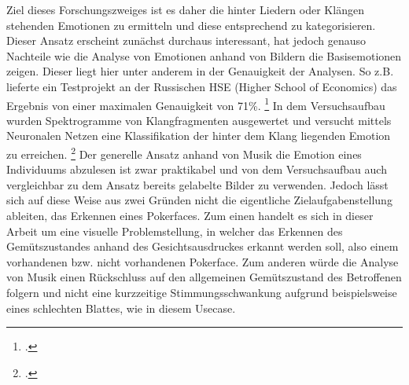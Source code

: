\documentclass[12pt, a4paper]{scrbook}
\begin{document}
Ziel dieses Forschungszweiges ist es daher die hinter Liedern oder Klängen stehenden Emotionen zu ermitteln und diese entsprechend zu kategorisieren.
Dieser Ansatz erscheint zunächst durchaus interessant, hat jedoch genauso Nachteile wie die Analyse von Emotionen anhand von Bildern die Basisemotionen zeigen. %
Dieser liegt hier unter anderem in der Genauigkeit der Analysen. So z.B. lieferte ein Testprojekt an der Russischen HSE (Higher School of Economics) das Ergebnis von einer maximalen Genauigkeit von 71\%.
\footcite[Vgl. ][Abstract]{EmotionInSound}
In dem Versuchsaufbau wurden Spektrogramme von Klangfragmenten ausgewertet und versucht mittels Neuronalen Netzen eine Klassifikation der hinter dem Klang liegenden Emotion zu erreichen.
\footcite[Vgl. ][Abstract]{EmotionInSound}
Der generelle Ansatz anhand von Musik die Emotion eines Individuums abzulesen ist zwar praktikabel und von dem Versuchsaufbau auch vergleichbar zu dem Ansatz bereits gelabelte Bilder zu verwenden. Jedoch lässt sich auf diese Weise aus zwei Gründen nicht die eigentliche Zielaufgabenstellung ableiten, das Erkennen eines Pokerfaces. Zum einen handelt es sich in dieser Arbeit um eine visuelle Problemstellung, in welcher das Erkennen des Gemütszustandes anhand des Gesichtsausdruckes erkannt werden soll, also einem vorhandenen bzw. nicht vorhandenen Pokerface. Zum anderen würde die Analyse von Musik einen Rückschluss auf den allgemeinen Gemütszustand des Betroffenen folgern und nicht eine kurzzeitige Stimmungsschwankung aufgrund beispielsweise eines schlechten Blattes, wie in diesem Usecase.


\let\cleardoublepage\relax
\newpage

\printbibheading
\printbibliography[type=book,heading=subbibliography,title={Literaturquellen}]
\pagestyle{empty}
\printbibliography[type=misc,heading=subbibliography,title={Sonstige Quellen}]
\pagestyle{empty}
\newpage
\pagestyle{empty}
\end{document}
